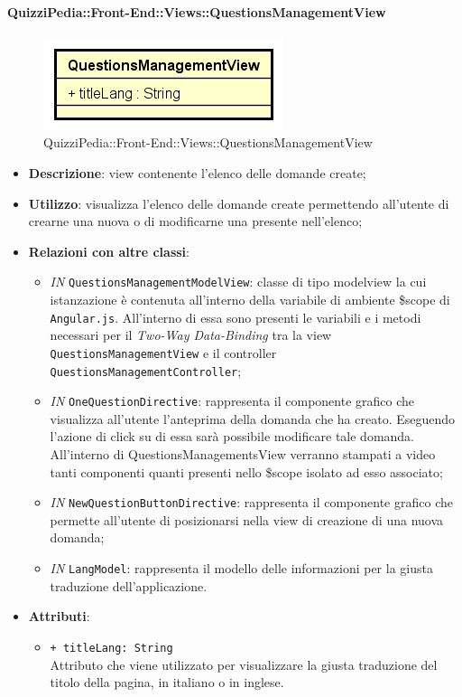 \paragraph{QuizziPedia::Front-End::Views::QuestionsManagementView}
\begin{figure} [ht]
	\centering
	\includegraphics[scale=0.45]{UML/Classi/Front-End/QuizziPedia_Front-end_Views_QuestionsManagementView.png}
	\caption{QuizziPedia::Front-End::Views::QuestionsManagementView}
\end{figure} \FloatBarrier
\begin{itemize}
	\item \textbf{Descrizione}: view contenente l'elenco delle domande create; 
	\item \textbf{Utilizzo}: visualizza l'elenco delle domande create permettendo all'utente di crearne una nuova o di modificarne una presente nell'elenco;
	\item \textbf{Relazioni con altre classi}:
	\begin{itemize} 
		\item \textit{IN} \texttt{QuestionsManagementModelView}: classe di tipo modelview la cui istanzazione è contenuta all'interno della variabile di ambiente \$scope di \texttt{Angular.js}. All'interno di essa sono presenti le variabili e i metodi necessari per il \textit{Two-Way Data-Binding} tra la view \texttt{QuestionsManagementView} e il controller \texttt{QuestionsManagementController};
		\item \textit{IN} \texttt{OneQuestionDirective}: rappresenta il componente grafico che visualizza all'utente l'anteprima della domanda che ha creato. Eseguendo l'azione di click su di essa sarà possibile modificare tale domanda. All'interno di QuestionsManagementsView verranno stampati a video tanti componenti quanti presenti nello \$scope isolato ad esso associato;
		\item \textit{IN} \texttt{NewQuestionButtonDirective}:  rappresenta il componente grafico che permette all'utente di posizionarsi nella view di creazione di una nuova domanda;
		\item \textit{IN} \texttt{LangModel}: rappresenta il modello delle informazioni per la giusta traduzione dell'applicazione. 
	\end{itemize}
	\item \textbf{Attributi}:
	\begin{itemize}
		\item \texttt{+ titleLang: String} \\ Attributo che viene utilizzato per visualizzare la giusta traduzione del titolo della pagina, in italiano o in inglese.
	\end{itemize}
\end{itemize}



